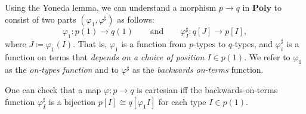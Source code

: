 \documentclass[11pt, one side, article]{memoir}
\theoremstyle{definition}
\theoremstyle{plain}
\newenvironment{remark}
  {\pushQED{\qed}\renewcommand{\qedsymbol}{$\lozenge$}\remarkx}
  {\popQED\endremarkx}
\newcommand{\Cat}[1]{\mathbf{#1}}%
\newcommand{\poly}{\Cat{Poly}}
\newcommand{\0}{\textsf{0}}
\newcommand{\1}{\tn{\textsf{1}}}
\newcommand{\qqand}{\qquad\text{and}\qquad}
\begin{document}
\begin{remark}\label{rem.positions_and_directions}
Using the Yoneda lemma, we can understand a morphism $p\to q$ in $\poly$ to consist of two parts $(\varphi_1,\varphi^\sharp)$ as follows:
\begin{equation}\label{eqn.mapsharp}
  \varphi_1\colon p(1)\to q(1)
  \qqand
  \varphi^\sharp_I\colon q[J]\to p[I],
\end{equation}
where $J\coloneqq\varphi_1(I)$. That is, $\varphi_1$ is a function from $p$-types to $q$-types, and $\varphi^\sharp_i$ is a function on terms that \emph{depends on a choice of position $I\in p(1)$}. We refer to $\varphi_1$ as the \emph{on-types function} and to $\varphi^\sharp$ as the \emph{backwards on-terms} function.

One can check that a map $\varphi\colon p\to q$ is cartesian iff the backwards-on-terms function $\varphi^\sharp_I$ is a bijection $p[I]\cong q[\varphi_1I]$ for each type $I\in p(1)$.
\end{remark}




\printbibliography 
\end{document}
